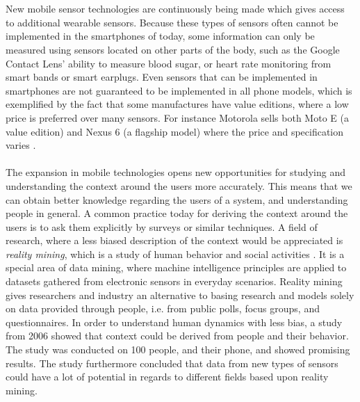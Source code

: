 \\\\
New mobile sensor technologies are continuously being made which gives access to additional wearable sensors. Because these types of sensors often cannot be implemented in the smartphones of today, some information can only be measured using sensors located on other parts of the body, such as the Google Contact Lens' ability to measure blood sugar, or heart rate monitoring from smart bands or smart earplugs. Even sensors that can be implemented in smartphones are not guaranteed to be implemented in all phone models, which is exemplified by the fact that some manufactures have value editions, where a low price is preferred over many sensors. For instance Motorola sells both Moto E (a value edition) and Nexus 6 (a flagship model) where the price and specification varies \parencite{moto_e_compared_to_nexus_6}.
\\\\
The expansion in mobile technologies opens new opportunities for studying and understanding the context around the users more accurately. This means that we can obtain better knowledge regarding the users of a system, and understanding people in general. A common practice today for deriving the context around the users is to ask them explicitly by surveys or similar techniques. A field of research, where a less biased description of the context would be appreciated is \emph{reality mining}, which is a study of human behavior and social activities \parencite{madan2009_reality_mining_privacy}. It is a special area of data mining, where machine intelligence principles are applied to datasets gathered from electronic sensors in everyday scenarios. Reality mining gives researchers and industry an alternative to basing research and models solely on data provided through people, i.e. from public polls, focus groups, and questionnaires. In order to understand human dynamics with less bias, a study from 2006 \parencite{eagle2006_reality_mining_definition} showed that context could be derived from people and their behavior. The study was conducted on 100 people, and their phone, and showed promising results. The study furthermore concluded that data from new types of sensors could have a lot of potential in regards to different fields based upon reality mining. 
\\\\

